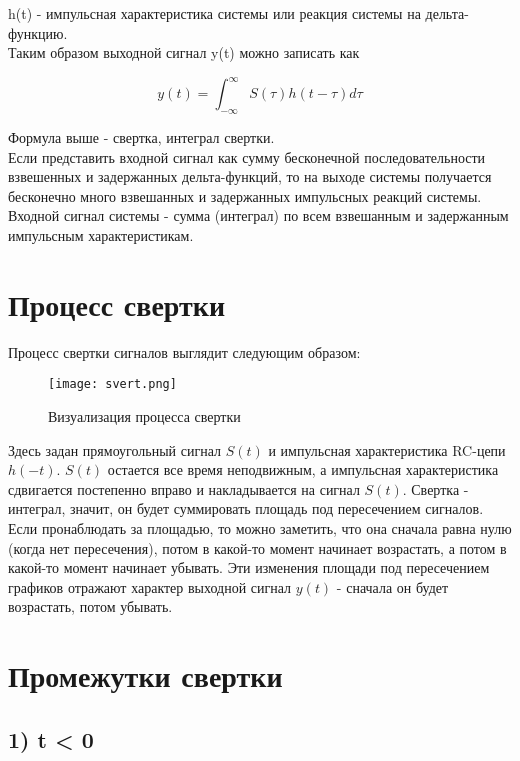 h(t) - импульсная характеристика системы или реакция системы на дельта-функцию. \\

Таким образом выходной сигнал y(t) можно записать как

$$\boxed{y(t) =  \int_{-\infty}^{\infty}S(\tau)h(t-\tau)d\tau}$$

Формула выше - свертка, интеграл свертки. \\

Если представить входной сигнал как сумму бесконечной последовательности взвешенных и задержанных дельта-функций, то на выходе
системы получается бесконечно много взвешанных и задержанных импульсных реакций системы. Входной сигнал системы - сумма (интеграл)
по всем взвешанным и задержанным импульсным характеристикам.

\section*{Процесс свертки}

Процесс свертки сигналов выглядит следующим образом:

\begin{figure}[H]
    \centering
    \texttt{[image: svert.png]}
    \caption{Визуализация процесса свертки}
\end{figure}

Здесь задан прямоугольный сигнал $S(t)$ и импульсная характеристика RC-цепи $h(-t)$. $S(t)$ остается все время неподвижным, а 
импульсная характеристика сдвигается постепенно вправо и накладывается на сигнал $S(t)$. Свертка - интеграл, значит, он будет
суммировать площадь под пересечением сигналов. \\

Если пронаблюдать за площадью, то можно заметить, что она сначала равна нулю (когда нет пересечения), потом в какой-то момент
начинает возрастать, а потом в какой-то момент начинает убывать. Эти изменения площади под пересечением графиков отражают характер
выходной сигнал  $y(t)$ - сначала он будет возрастать, потом убывать.

\section*{Промежутки свертки}

\subsection*{1) t < 0}

